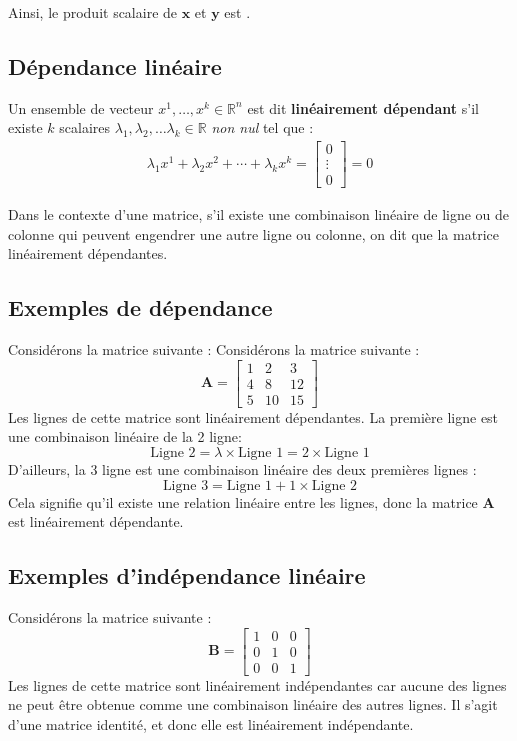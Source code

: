 \documentclass{report}
\begin{document}
\begin{multicols*}{2}
Ainsi, le produit scalaire de \( \boldsymbol{x} \) et \( \boldsymbol{y} \) est .

\subsection{Dépendance linéaire}
    \begin{note}{}{}
        Un ensemble de vecteur $x^1, \dots, x^k \in \mathbb{R}^n$ 
        est dit \textbf{linéairement dépendant} s'il existe  
        $k$ scalaires $\lambda_{1}, \lambda_{2}, \dots \lambda_{k} 
        \in \mathbb{R}$ \textit{non nul} tel que :  
        \begin{align*}
            \lambda_{1}x^1 + \lambda_{2}x^2  + 
            \cdots 
            + \lambda_{k}x^k = 
        \begin{bmatrix} 0 \\ \vdots \\ 0 \end{bmatrix}  = 0
        \end{align*}
    \end{note}  

        Dans le contexte d'une matrice, s'il existe une 
        combinaison linéaire de ligne ou de colonne 
        qui peuvent engendrer une autre ligne ou colonne, on dit que la matrice 
        linéairement dépendantes.

\subsection{Exemples de dépendance}
Considérons la matrice suivante :
Considérons la matrice suivante :
\[
\mathbf{A} = 
\begin{bmatrix}
1 & 2 & 3 \\
4 & 8 & 12 \\
5 & 10 & 15
\end{bmatrix}
\]
Les lignes de cette matrice sont linéairement dépendantes. La première 
ligne est une combinaison linéaire de la 2 ligne:
\[
\text{Ligne 2} = \lambda \times \text{Ligne 1} = 2 \times \text{Ligne 1}
\]
D'ailleurs, la 3 ligne est une combinaison linéaire des deux premières lignes :
\[
\text{Ligne 3} = \text{Ligne 1} + 1\times \text{Ligne 2} 
\]
Cela signifie qu'il existe une relation linéaire entre les lignes, donc la matrice
\(\mathbf{A}\) est linéairement dépendante.


\subsection{Exemples d'indépendance linéaire}
Considérons la matrice suivante :
\[
\mathbf{B} = 
\begin{bmatrix}
1 & 0 & 0 \\
0 & 1 & 0 \\
0 & 0 & 1
\end{bmatrix}
\]
Les lignes de cette matrice sont linéairement indépendantes car aucune des lignes 
ne peut être obtenue comme une combinaison linéaire des autres lignes. 
Il s'agit d'une matrice identité, et donc elle est linéairement indépendante.


\end{multicols*}
\end{document}
